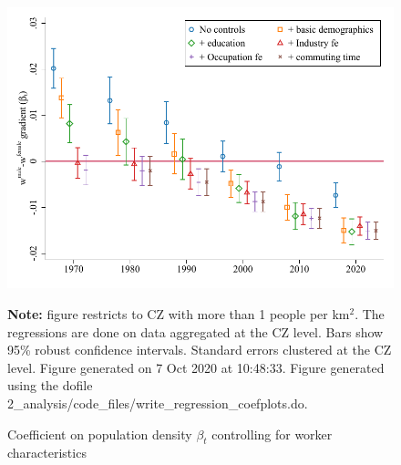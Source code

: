 \begin{figure}[!h]
\centering
\caption{Coefficient on population density $ \beta_t $ controlling for worker characteristics}
\includegraphics[width=.6\textwidth]{../2_analysis/output/figures/with_control_gradients_individual_l_czone_density_full_time}
\par \begin{minipage}[h]{\textwidth}{\tiny\textbf{Note:} figure restricts to CZ with more than 1 people per km$^2$. The regressions are done on data aggregated at the CZ level. Bars show 95\% robust confidence intervals. Standard errors clustered at the CZ level. Figure generated on  7 Oct 2020 at 10:48:33. Figure generated using the dofile 2\_analysis/code\_files/write\_regression\_coefplots.do.}\end{minipage}
\end{figure}
